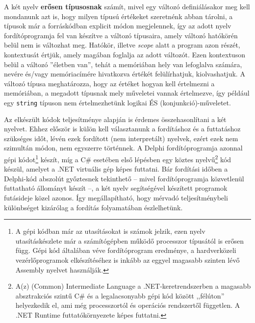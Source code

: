 \documentclass[tocnopagenum]{thesis-ekf}
\begin{document}
	A két nyelv \textbf{erősen típusosnak} számít, mivel egy változó definiálásakor meg kell mondanunk azt is, hogy milyen típusú értékeket szeretnénk abban tárolni, a típusok már a forráskódban explicit módon megjelennek, így az adott nyelv fordítóprogramja fel van készítve a változó típusaira, amely változó hatókörén belül nem is változhat meg. Hatókör, illetve \textit{scope} alatt a program azon részét, kontextusát értjük, amely magában foglalja az adott változót. Ezen kontextuson belül a változó ''életben van'', tehát a memóriában hely van lefoglalva számára, nevére és/vagy memóriacímére hivatkozva értékét felülírhatjuk, kiolvashatjuk. A változó típusa meghatározza, hogy az értéket hogyan kell értelmezni a memóriában, a megadott típusnak mely műveletei vannak értelmezve, így például egy \verb|string| típuson nem értelmezhetünk logikai ÉS (konjunkció)-műveletet.
	
	Az elkészült kódok teljesítménye alapján is érdemes összehasonlítani a két nyelvet. Ehhez először is külön kell választanunk a fordításhoz és a futtatáshoz szükséges időt, lévén ezek fordított (nem interpretált) nyelvek, ezért ezek nem szimultán módon, nem egyszerre történnek. A Delphi fordítóprogramja azonnal gépi kódot\footnote{A gépi kódban már az utasításokat is számok jelzik, ezen nyelv utasításkészlete már a számítógépben működő processzor típusától is erősen függ. Gépi kód általában véve fordítóprogram eredménye, a hardverközeli vezérlőprogramok elkészítéséhez is inkább az eggyel magasabb szinten lévő Assembly nyelvet használják.} készít, míg a C\# esetében első lépésben egy köztes nyelvű\footnote{A(z) (Common) Intermediate Language a .NET-keretrendszerben a magasabb absztrakciós szintű C\# és a legalacsonyabb gépi kód között ,,félúton'' helyezkedik el, ami még processzortól és operációs rendszertől független. A .NET Runtime futtatókörnyezete képes futtatni.} kód készül, amelyet a .NET virtuális gép képes futtatni. Bár fordítási időben a Delphi-kód abszolút győztesnek tekinthető -- mivel fordítóprogramja közvetlenül futtatható állományt készít --, a két nyelv segítségével készített programok futásideje közel azonos. Így megállapítható, hogy mérvadó teljesítménybeli különbséget kizárólag a fordítás folyamatában észlelhetünk.
	
\end{document}
